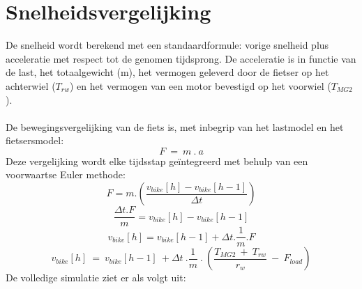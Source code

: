 \section{Snelheidsvergelijking}
\noindent De snelheid wordt berekend met een standaardformule: vorige snelheid plus acceleratie met respect tot de genomen tijdsprong. De acceleratie is in functie van de last, het totaalgewicht (m), het vermogen geleverd door de fietser op het achterwiel ($T_{rw}$) en het vermogen van een motor bevestigd op het voorwiel ($T_{MG2}$). 
\\\\
De bewegingsvergelijking van de fiets is, met inbegrip van het lastmodel en het fietsersmodel:
\[F \ = \  m \ . \ a \]
Deze vergelijking wordt elke tijdsstap geïntegreerd met behulp van een voorwaartse Euler methode:
\[F = m.(\frac{v_{bike}[h]-v_{bike}[h-1]}{\Delta t})\]
\[ \frac{\Delta t. F}{m}=v_{bike}[h]-v_{bike}[h-1]\]
\[v_{bike}[h]=v_{bike}[h-1]+\Delta t .\frac{1}{m}.F\]
\[v_{bike}[h] \ = \ v_{bike}[h-1] \ + \Delta t  \ . \frac{1}{m} \ . \ (\frac{T_{MG2} \ + \ T_{rw}}{r_w} \ - \ F_{load})\]
De volledige simulatie ziet er als volgt uit:
\\\\

